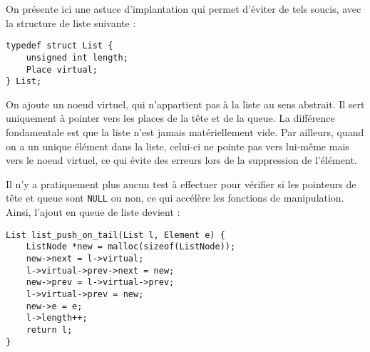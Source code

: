 \documentclass[../../../main.tex]{subfiles}
\begin{document}
On présente ici une astuce d'implantation qui permet d'éviter de tels soucis, avec la structure de liste suivante :
\begin{verbatim}
typedef struct List {
	unsigned int length;
	Place virtual;
} List;
\end{verbatim}
On ajoute un noeud virtuel, qui n'appartient pas à la liste au sens abstrait. Il sert uniquement à pointer vers les places de la tête et de la queue. La différence fondamentale est que la liste n'est jamais matériellement vide. Par ailleurs, quand on a un unique élément dans la liste, celui-ci ne pointe pas vers lui-même mais vers le noeud virtuel, ce qui évite des erreurs lors de la suppression de l'élément.

\begin{minipage}{\textwidth}
	\begin{center}
		
	\end{center}
\end{minipage}

Il n'y a pratiquement plus aucun test à effectuer pour vérifier si les pointeurs de tête et queue sont \texttt{NULL} ou non, ce qui accélère les fonctions de manipulation.\newline
Ainsi, l'ajout en queue de liste devient :
\begin{verbatim}
List list_push_on_tail(List l, Element e) {
	ListNode *new = malloc(sizeof(ListNode));
	new->next = l->virtual;
	l->virtual->prev->next = new;
	new->prev = l->virtual->prev;
	l->virtual->prev = new;
	new->e = e;
	l->length++;
	return l;
}
\end{verbatim}
\end{document}
